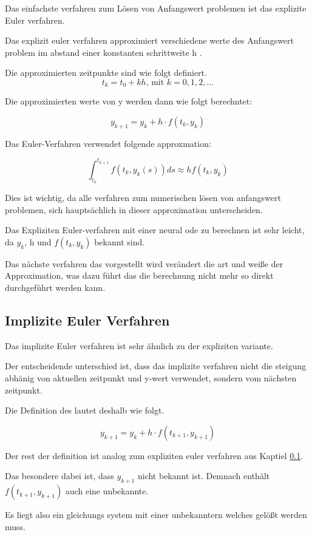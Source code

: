 Das einfachste verfahren zum Lösen von Anfangswert problemen ist das explizite Euler verfahren.

Das explizit euler verfahren approximiert verschiedene werte des Anfangswert problem 
im abstand einer konstanten schrittweite h .

Die approximierten zeitpunkte sind wie folgt definiert.
$$
t_k = t_0 + kh \text{, mit } k = 0, 1, 2, ...
$$

Die approximierten werte von y werden dann wie folgt berechntet:

$$
y_{k + 1} = y_{k} + h \cdot f(t_k, y_k)
$$

Das Euler-Verfahren verwendet folgende approxmation:

$$
\int_{t_k}^{t_{k+1}} f(t_k, y_k(s)) ds \approx h f(t_k, y_k)
$$

Dies ist wichtig, da alle verfahren zum numerischen lösen von anfangswert problemen, sich hauptsächlich in dieser approximation unterscheiden.

Das Expliziten Euler-verfahren mit einer neural ode zu berechnen
ist sehr leicht, da $y_k$, h und $f(t_k, y_k)$ bekannt sind.

Das nächste verfahren das vorgestellt wird verändert die art und weiße der Approximation, was dazu führt das die berechnung nicht mehr so direkt durchgeführt werden kann.



\subsection{Implizite Euler Verfahren}

Das implizite Euler verfahren ist sehr ähnlich zu der expliziten variante.

Der entscheidende unterschied ist, dass das implizite verfahren nicht die steigung abhänig von aktuellen 
zeitpunkt und y-wert verwendet, sondern vom nächsten zeitpunkt.

Die Definition des lautet deshalb wie folgt.

$$
y_{k + 1} = y_k + h \cdot f(t_{k + 1}, y_{k + 1})
$$

Der rest der definition ist analog zum expliziten euler verfahren aus Kaptiel \ref{}.

Das besondere dabei ist, dass $y_{k + 1}$ nicht bekannt ist.
Demnach enthält $f(t_{k + 1}, y_{k + 1})$ auch eine unbekannte.

Es liegt also ein gleichungs system mit einer unbekanntern welches gelößt werden muss.

